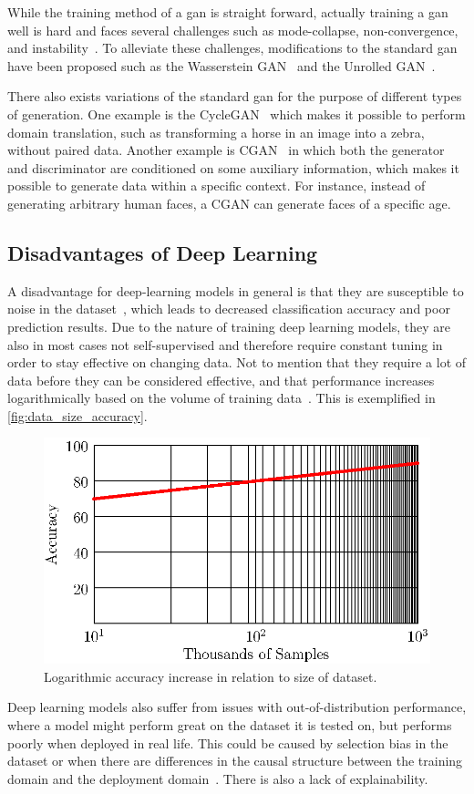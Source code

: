 \par
While the training method of a \gls*{gan} is straight forward, actually training a \gls*{gan} well is hard and faces several challenges such as mode-collapse, non-convergence, and instability~\cite{gan_challenges,gan_challenges2}. To alleviate these challenges, modifications to the standard \gls*{gan} have been proposed such as the Wasserstein GAN~\cite{wgan} and the Unrolled GAN~\cite{unrolled_gan}.
\par
There also exists variations of the standard \gls*{gan} for the purpose of different types of generation. One example is the CycleGAN~\cite{CycleGAN} which makes it possible to perform domain translation, such as transforming a horse in an image into a zebra, without paired data. Another example is CGAN~\cite{cgan}  in which both the generator and discriminator are conditioned on some auxiliary information, which makes it possible to generate data within a specific context. For instance, instead of generating arbitrary human faces, a CGAN can generate faces of a specific age.
\subsection{Disadvantages of Deep Learning}
A disadvantage for deep-learning models in general is that they are susceptible to noise in the dataset~\cite{noise1,noise2}, which leads to decreased classification accuracy and poor prediction results. Due to the nature of training deep learning models, they are also in most cases not self-supervised and therefore require constant tuning in order to stay effective on changing data. Not to mention that they require a lot of data before they can be considered effective, and that performance increases logarithmically based on the volume of training data~\cite{deeplearning_dataset}. This is exemplified in \autoref{fig:data_size_accuracy}.
\begin{figure}[htb]
    \centering
    \includegraphics[width=0.7\linewidth]{resources/related_works/training_volume}
    \caption[Dataset Volume Accuracy]{Logarithmic accuracy increase in relation to size of dataset.}
    \label{fig:data_size_accuracy}
\end{figure}
\par
Deep learning models also suffer from issues with out-of-distribution performance, where a model might perform great on the dataset it is tested on, but performs poorly when deployed in real life. This could be caused by selection bias in the dataset or when there are differences in the causal structure between the training domain and the deployment domain~\cite{deeplearning_ood}. There is also a lack of explainability.
